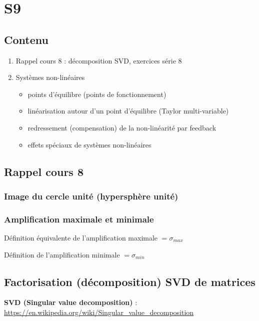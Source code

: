 \documentclass[document.tex]{subfiles}
\begin{document}
\section{S9}

\subsection{Contenu}

\begin{enumerate}
\item Rappel cours 8 : décomposition SVD, exercices série 8
\item Systèmes non-linéaires
\begin{itemize}
\item points d'équilibre (points de fonctionnement)
\item linéarisation autour d'un point d'équilibre (Taylor multi-variable)
\item redressement (compensation) de la non-linéarité par feedback
\item effets spéciaux de systèmes non-linéaires
\end{itemize}
\end{enumerate}

\subsection{Rappel cours 8}

\subsubsection{Image du cercle unité (hypersphère unité)}


\subsubsection{Amplification maximale et minimale}

Définition équivalente de l'amplification maximale $=\sigma_{max}$

Définition de l'amplification minimale $=\sigma_{min}$

\subsection{Factorisation (décomposition) SVD de matrices}

\textbf{SVD (Singular value decomposition)} : \url{https://en.wikipedia.org/wiki/Singular_value_decomposition}
\end{document}
